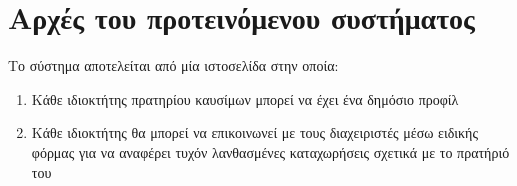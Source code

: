 \section{Αρχές του προτεινόμενου συστήματος}

Το σύστημα αποτελείται από μία ιστοσελίδα στην οποία:
\begin{enumerate}
	\item Κάθε ιδιοκτήτης πρατηρίου καυσίμων μπορεί να έχει ένα δημόσιο προφίλ
	\item Κάθε ιδιοκτήτης θα μπορεί να επικοινωνεί με τους διαχειριστές μέσω ειδικής φόρμας για να αναφέρει τυχόν λανθασμένες καταχωρήσεις σχετικά με το πρατήριό του
\end{enumerate}

